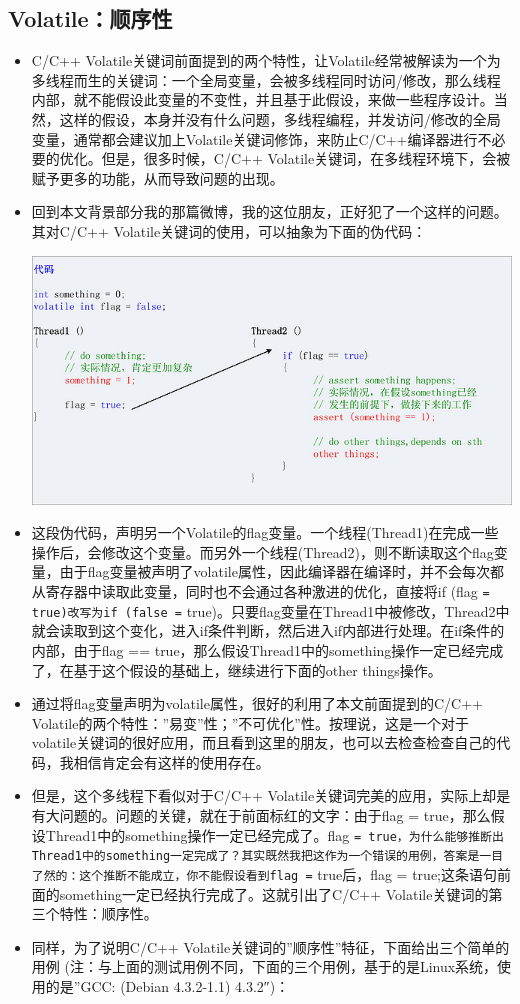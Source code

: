 \documentclass[9pt,b5paper]{article}
\begin{document}
\subsection{Volatile：顺序性}
\label{sec-8-3}
\begin{itemize}
\item C/C++ Volatile关键词前面提到的两个特性，让Volatile经常被解读为一个为多线程而生的关键词：一个全局变量，会被多线程同时访问/修改，那么线程内部，就不能假设此变量的不变性，并且基于此假设，来做一些程序设计。当然，这样的假设，本身并没有什么问题，多线程编程，并发访问/修改的全局变量，通常都会建议加上Volatile关键词修饰，来防止C/C++编译器进行不必要的优化。但是，很多时候，C/C++ Volatile关键词，在多线程环境下，会被赋予更多的功能，从而导致问题的出现。
\item 回到本文背景部分我的那篇微博，我的这位朋友，正好犯了一个这样的问题。其对C/C++ Volatile关键词的使用，可以抽象为下面的伪代码：

\includegraphics[width=.9\linewidth]{../pic/v5.jpg}
\item 这段伪代码，声明另一个Volatile的flag变量。一个线程(Thread1)在完成一些操作后，会修改这个变量。而另外一个线程(Thread2)，则不断读取这个flag变量，由于flag变量被声明了volatile属性，因此编译器在编译时，并不会每次都从寄存器中读取此变量，同时也不会通过各种激进的优化，直接将if (flag \texttt{= true)改写为if (false =} true)。只要flag变量在Thread1中被修改，Thread2中就会读取到这个变化，进入if条件判断，然后进入if内部进行处理。在if条件的内部，由于flag == true，那么假设Thread1中的something操作一定已经完成了，在基于这个假设的基础上，继续进行下面的other things操作。
\item 通过将flag变量声明为volatile属性，很好的利用了本文前面提到的C/C++ Volatile的两个特性：”易变”性；”不可优化”性。按理说，这是一个对于volatile关键词的很好应用，而且看到这里的朋友，也可以去检查检查自己的代码，我相信肯定会有这样的使用存在。
\item 但是，这个多线程下看似对于C/C++ Volatile关键词完美的应用，实际上却是有大问题的。问题的关键，就在于前面标红的文字：由于flag = true，那么假设Thread1中的something操作一定已经完成了。flag \texttt{= true，为什么能够推断出Thread1中的something一定完成了？其实既然我把这作为一个错误的用例，答案是一目了然的：这个推断不能成立，你不能假设看到flag =} true后，flag = true;这条语句前面的something一定已经执行完成了。这就引出了C/C++ Volatile关键词的第三个特性：顺序性。
\item 同样，为了说明C/C++ Volatile关键词的”顺序性”特征，下面给出三个简单的用例 (注：与上面的测试用例不同，下面的三个用例，基于的是Linux系统，使用的是”GCC: (Debian 4.3.2-1.1) 4.3.2″)：
\end{itemize}
\end{document}
